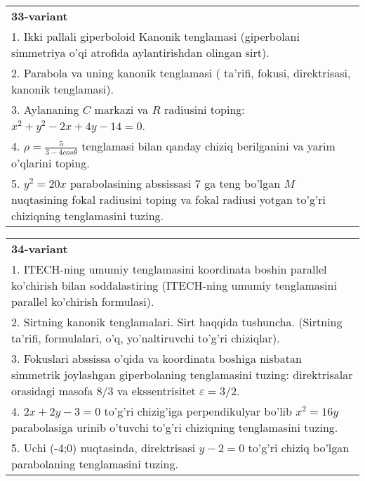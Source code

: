 \documentclass{article}
\begin{document}
\begin{tabular}{m{17cm}}
\textbf{33-variant}\\
1. Ikki pallali giperboloid Kanonik tenglamasi (giperbolani simmetriya o'qi atrofida aylantirishdan olingan sirt).\\

2. Parabola va uning kanonik tenglamasi ( ta'rifi, fokusi, direktrisasi, kanonik tenglamasi).\\

3. Aylananing $C$ markazi va $R$ radiusini toping: $x^2+y^2-2x+4y-14=0$.\\

4. $\rho = \frac{5}{3 - 4cos\theta}$ tenglamasi bilan qanday chiziq berilganini va yarim o'qlarini toping.  \\

5. $y^{2} = 20x$ parabolasining abssissasi 7 ga teng bo'lgan $M$ nuqtasining fokal radiusini toping va fokal radiusi yotgan to'g'ri chiziqning tenglamasini tuzing.  
\end{tabular}
\vspace{1cm}


\begin{tabular}{m{17cm}}
\textbf{34-variant}\\
1. ITECH-ning umumiy tenglamasini koordinata boshin parallel ko'chirish bilan soddalastiring (ITECH-ning umumiy tenglamasini parallel ko'chirish formulasi).\\

2. Sirtning kanonik tenglamalari. Sirt haqqida tushuncha. (Sirtning ta'rifi, formulalari, o'q, yo'naltiruvchi to'g'ri chiziqlar).\\

3. Fokuslari abssissa o'qida va koordinata boshiga nisbatan simmetrik joylashgan giperbolaning tenglamasini tuzing: direktrisalar orasidagi masofa $8/3$ va ekssentrisitet $\varepsilon=3/2$.\\

4. $2x + 2y - 3 = 0$ to'g'ri chizig'iga perpendikulyar bo'lib $x^{2} = 16y$ parabolasiga urinib o'tuvchi to'g'ri chiziqning tenglamasini tuzing.  \\

5. Uchi (-4;0) nuqtasinda, direktrisasi $y - 2 = 0$ to'g'ri chiziq bo'lgan parabolaning tenglamasini tuzing.
\end{tabular}
\vspace{1cm}
\end{document}
